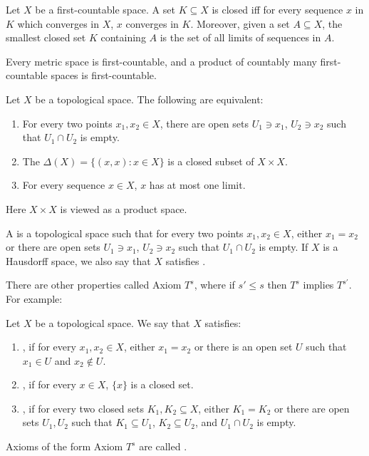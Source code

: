 \begin{lemma}
Let $X$ be a first-countable space.
A set $K \subseteq X$ is closed iff for every sequence $x$ in $K$ which converges in $X$, $x$ converges in $K$.
Moreover, given a set $A \subseteq X$, the smallest closed set $K$ containing $A$ is the set of all limits of sequences in $A$.
\end{lemma}

\begin{lemma}
Every metric space is first-countable, and a product of countably many first-countable spaces is first-countable.
\end{lemma}

\begin{lemma}
Let $X$ be a topological space. The following are equivalent:
\begin{enumerate}
\item For every two points $x_1, x_2 \in X$, there are open sets $U_1 \ni x_1$, $U_2 \ni x_2$ such that $U_1 \cap U_2$ is empty.
\item The  $\Delta(X) = \{(x, x): x \in X\}$ is a closed subset of $X \times X$.
\item For every sequence $x \in X$, $x$ has at most one limit.
\end{enumerate}
Here $X \times X$ is viewed as a product space.
\end{lemma}

\begin{definition}
A  is a topological space such that for every two points $x_1, x_2 \in X$, either $x_1 = x_2$ or there are open sets $U_1 \ni x_1$, $U_2 \ni x_2$ such that $U_1 \cap U_2$ is empty.
If $X$ is a Hausdorff space, we also say that $X$ satisfies .
\end{definition}

\begin{subsec}
There are other properties called Axiom $T^s$, where if $s' \leq s$ then $T^s$ implies $T^{s'}$. For example:
\end{subsec}

\begin{definition}
Let $X$ be a topological space. We say that $X$ satisfies:
\begin{enumerate}
\item {}, if for every $x_1, x_2 \in X$, either $x_1 = x_2$ or there is an open set $U$ such that $x_1 \in U$ and $x_2 \notin U$.
\item {}, if for every $x \in X$, $\{x\}$ is a closed set.
\item {}, if for every two closed sets $K_1, K_2 \subseteq X$, either $K_1 = K_2$ or there are open sets $U_1, U_2$ such that $K_1 \subseteq U_1$, $K_2 \subseteq U_2$, and $U_1 \cap U_2$ is empty.
\end{enumerate}
Axioms of the form Axiom $T^s$ are called .
\end{definition}

